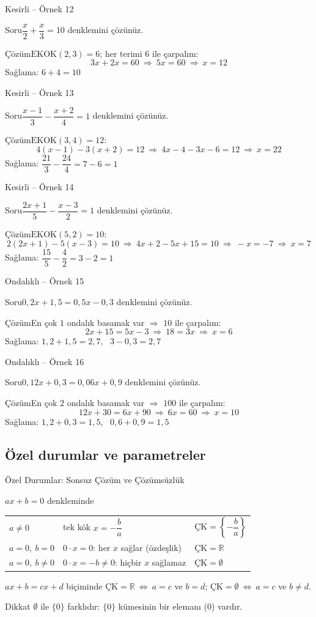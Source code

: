 \documentclass[aspectratio=169,11pt]{beamer}
\newcommand{\soru}[3]{%
\begin{frame}{#1}
  \begin{block}{Soru}\large #2\end{block}
  \pause
  \begin{exampleblock}{Çözüm}\large #3\end{exampleblock}
\end{frame}}
\begin{document}
\soru{Kesirli -- Örnek 12}
{\(\dfrac{x}{2}+\dfrac{x}{3}=10\) denklemini çözünüz.}
{\(\text{EKOK}(2,3)=6\); her terimi \(6\) ile çarpalım:
\[3x+2x=60\ \Rightarrow\ 5x=60\ \Rightarrow\ x=12\]
Sağlama: \(6+4=10\) \checkmark}

\soru{Kesirli -- Örnek 13}
{\(\dfrac{x-1}{3}-\dfrac{x+2}{4}=1\) denklemini çözünüz.}
{\(\text{EKOK}(3,4)=12\):
\[4(x-1)-3(x+2)=12\ \Rightarrow\ 4x-4-3x-6=12\ \Rightarrow\ x=22\]
Sağlama: \(\dfrac{21}{3}-\dfrac{24}{4}=7-6=1\) \checkmark}

\soru{Kesirli -- Örnek 14}
{\(\dfrac{2x+1}{5}-\dfrac{x-3}{2}=1\) denklemini çözünüz.}
{\(\text{EKOK}(5,2)=10\):
\[2(2x+1)-5(x-3)=10\ \Rightarrow\ 4x+2-5x+15=10\ \Rightarrow\ -x=-7\ \Rightarrow\ x=7\]
Sağlama: \(\dfrac{15}{5}-\dfrac{4}{2}=3-2=1\) \checkmark}

\soru{Ondalıklı -- Örnek 15}
{\(0{,}2x+1{,}5=0{,}5x-0{,}3\) denklemini çözünüz.}
{En çok \(1\) ondalık basamak var \(\Rightarrow\) \(10\) ile çarpalım:
\[2x+15=5x-3\ \Rightarrow\ 18=3x\ \Rightarrow\ x=6\]
Sağlama: \(1{,}2+1{,}5=2{,}7\), \ \(3-0{,}3=2{,}7\) \checkmark}

\soru{Ondalıklı -- Örnek 16}
{\(0{,}12x+0{,}3=0{,}06x+0{,}9\) denklemini çözünüz.}
{En çok \(2\) ondalık basamak var \(\Rightarrow\) \(100\) ile çarpalım:
\[12x+30=6x+90\ \Rightarrow\ 6x=60\ \Rightarrow\ x=10\]
Sağlama: \(1{,}2+0{,}3=1{,}5\), \ \(0{,}6+0{,}9=1{,}5\) \checkmark}

\subsection{Özel durumlar ve parametreler}
\begin{frame}{Özel Durumlar: Sonsuz Çözüm ve Çözümsüzlük}
\begin{block}{\(ax+b=0\) denkleminde}
\begin{tabular}{@{}lll@{}}
\(a\neq 0\) & tek kök \(x=-\dfrac{b}{a}\) & \(\text{ÇK}=\left\{-\dfrac{b}{a}\right\}\)\\[8pt]
\(a=0,\ b=0\) & \(0\cdot x=0\): her \(x\) sağlar (özdeşlik) & \(\text{ÇK}=\mathbb{R}\)\\[4pt]
\(a=0,\ b\neq 0\) & \(0\cdot x=-b\neq 0\): hiçbir \(x\) sağlamaz & \(\text{ÇK}=\emptyset\)
\end{tabular}
\end{block}
\begin{block}{\(ax+b=cx+d\) biçiminde}
\(\text{ÇK}=\mathbb{R}\ \Leftrightarrow\ a=c\) ve \(b=d\); \qquad \(\text{ÇK}=\emptyset\ \Leftrightarrow\ a=c\) ve \(b\neq d\).
\end{block}
\begin{alertblock}{Dikkat}
\(\emptyset\) ile \(\{0\}\) farklıdır: \(\{0\}\) kümesinin bir elemanı (\(0\)) vardır.
\end{alertblock}
\end{frame}
\end{document}
